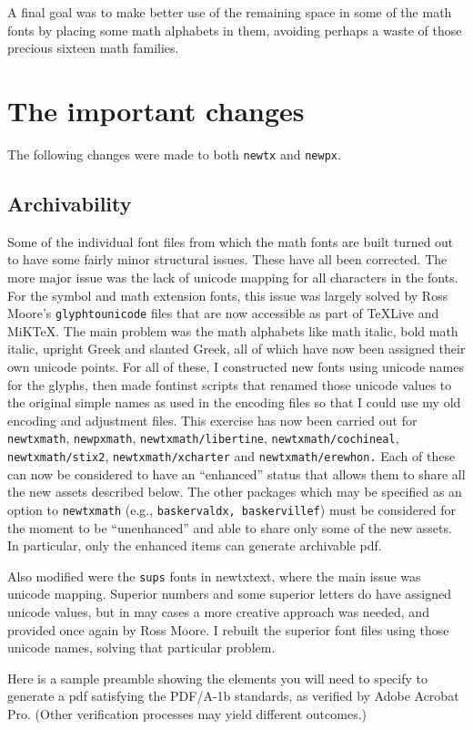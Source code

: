 \documentclass[\fsc]{article}
\theoremstyle{oldplain}
\theoremstyle{plain}
\begin{document}
A final goal was to make better use of the remaining space in some of the math fonts by placing some math alphabets in them, avoiding perhaps a waste of those precious sixteen math families.
\section{The important changes}
The following changes were made to both {\tt newtx} and {\tt newpx}.
\subsection{Archivability}
Some of the individual font files from which the math fonts are built turned out to have some fairly minor structural issues. These have all been corrected. The more major issue was the lack of unicode mapping for all characters in the fonts. For the symbol and math extension fonts, this issue was largely solved by Ross Moore's {\tt glyphtounicode} files that are now accessible as part of TeXLive and MiKTeX. The main problem was the math alphabets like math italic, bold math italic, upright Greek and slanted Greek, all of which have now been assigned their own unicode points. For all of these, I constructed new fonts using unicode names for the glyphs, then made \textsf{fontinst} scripts that renamed those unicode values to the original simple names as used in the encoding files so that I could use my old encoding and adjustment files. This exercise has now been carried out for {\tt newtxmath}, {\tt newpxmath}, {\tt newtxmath/libertine}, {\tt newtxmath/cochineal}, {\tt newtxmath/stix2}, {\tt newtxmath/xcharter} and {\tt newtxmath/erewhon.} Each of these can now be considered to have an ``enhanced'' status that allows them to share all the new assets described below. 
 The other packages which may be specified as an option to {\tt newtxmath} (e.g., {\tt baskervaldx, baskervillef}) must be considered for the moment to be ``unenhanced'' and able to share only some of the new assets. In particular, only the enhanced items can generate archivable pdf. 

Also modified were the {\tt sups} fonts in {newtxtext}, where the main issue was unicode mapping. Superior numbers and some superior letters do have assigned unicode values, but in may cases a more creative approach was needed, and provided once again by Ross Moore. I rebuilt the superior font files using those unicode names, solving that particular problem.

Here is a sample  preamble showing the elements you will need to specify to generate a pdf satisfying the PDF/A-1b standards, as verified by Adobe Acrobat Pro. (Other verification processes may yield different outcomes.)
\end{document}
